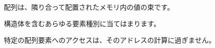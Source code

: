 ﻿\subsection{\Conclusion{}}

配列は、隣り合って配置されたメモリ内の値の束です。

構造体を含むあらゆる要素種別に当てはまります。

特定の配列要素へのアクセスは、そのアドレスの計算に過ぎません。
